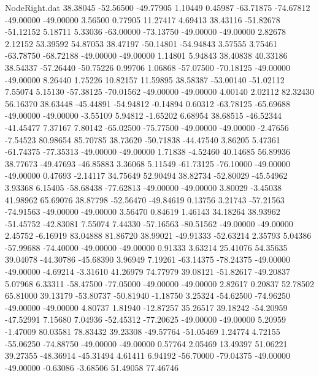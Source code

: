 \begin{filecontents}{NodeRight.dat}
  38.38045  -52.56500  -49.77905     1.10449    0.45987  -63.71875  -74.67812  -49.00000  -49.00000    3.56500    0.77905   11.27417    4.69413
  38.43116  -51.82678  -51.12152     5.18711    5.33036  -63.00000  -73.13750  -49.00000  -49.00000    2.82678    2.12152   53.39592   54.87053
  38.47197  -50.14801  -54.94843     3.57555    3.75461  -63.78750  -68.72188  -49.00000  -49.00000    1.14801    5.94843   38.40838   40.33186
  38.54337  -57.26440  -50.75226     0.99706    1.06868  -57.07500  -70.18125  -49.00000  -49.00000    8.26440    1.75226   10.82157   11.59895
  38.58387  -53.00140  -51.02112     7.55074    5.15130  -57.38125  -70.01562  -49.00000  -49.00000    4.00140    2.02112   82.32430   56.16370
  38.63448  -45.44891  -54.94812    -0.14894    0.60312  -63.78125  -65.69688  -49.00000  -49.00000   -3.55109    5.94812   -1.65202    6.68954
  38.68515  -46.52344  -41.45477     7.37167    7.80142  -65.02500  -75.77500  -49.00000  -49.00000   -2.47656   -7.54523   80.98654   85.70785
  38.73620  -50.71838  -44.47540     3.86205    5.47361  -61.74375  -77.35313  -49.00000  -49.00000    1.71838   -4.52460   40.14685   56.89936
  38.77673  -49.47693  -46.85883     3.36068    5.11549  -61.73125  -76.10000  -49.00000  -49.00000    0.47693   -2.14117   34.75649   52.90494
  38.82734  -52.80029  -45.54962     3.93368    6.15405  -58.68438  -77.62813  -49.00000  -49.00000    3.80029   -3.45038   41.98962   65.69076
  38.87798  -52.56470  -49.84619     0.13756    3.21743  -57.21563  -74.91563  -49.00000  -49.00000    3.56470    0.84619    1.46143   34.18264
  38.93962  -51.45752  -42.83081     7.55074    7.44330  -57.16563  -80.51562  -49.00000  -49.00000    2.45752   -6.16919   83.04888   81.86720
  38.99021  -49.91333  -52.63214     2.35793    5.04386  -57.99688  -74.40000  -49.00000  -49.00000    0.91333    3.63214   25.41076   54.35635
  39.04078  -44.30786  -45.68390     3.96949    7.19261  -63.14375  -78.24375  -49.00000  -49.00000   -4.69214   -3.31610   41.26979   74.77979
  39.08121  -51.82617  -49.20837     5.07968    6.33311  -58.47500  -77.05000  -49.00000  -49.00000    2.82617    0.20837   52.78502   65.81000
  39.13179  -53.80737  -50.81940    -1.18750    3.25324  -54.62500  -74.96250  -49.00000  -49.00000    4.80737    1.81940  -12.87257   35.26517
  39.18242  -54.20959  -47.52991     7.15680    7.04936  -52.45312  -77.20625  -49.00000  -49.00000    5.20959   -1.47009   80.03581   78.83432
  39.23308  -49.57764  -51.05469     1.24774    4.72155  -55.06250  -74.88750  -49.00000  -49.00000    0.57764    2.05469   13.49397   51.06221
  39.27355  -48.36914  -45.31494     4.61411    6.94192  -56.70000  -79.04375  -49.00000  -49.00000   -0.63086   -3.68506   51.49058   77.46746

\end{filecontents}
